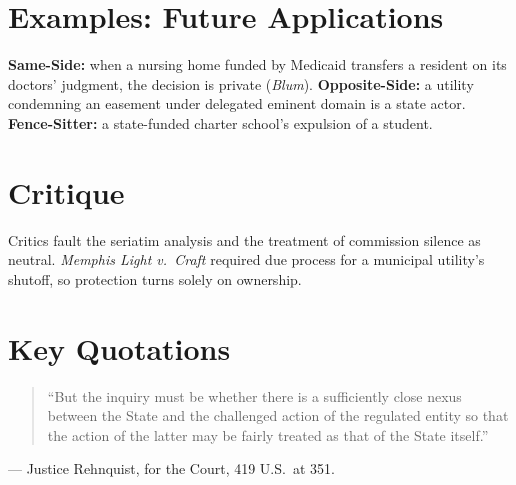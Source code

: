 \documentclass[12pt]{article}
\begin{document}
\section{Examples: Future Applications}
\textbf{Same-Side:} when a nursing home funded by Medicaid transfers a resident on its doctors' judgment, the decision is private (\textit{Blum}). \textbf{Opposite-Side:} a utility condemning an easement under delegated eminent domain is a state actor. \textbf{Fence-Sitter:} a state-funded charter school's expulsion of a student.

\section{Critique}
Critics fault the seriatim analysis and the treatment of commission silence as neutral. \textit{Memphis Light v.\ Craft} required due process for a municipal utility's shutoff, so protection turns solely on ownership.

\section{Key Quotations}
\begin{quote}
``But the inquiry must be whether there is a sufficiently close nexus between the State and the challenged action of the regulated entity so that the action of the latter may be fairly treated as that of the State itself.''
\end{quote}
\noindent --- Justice Rehnquist, for the Court, 419 U.S.\ at 351.
\end{document}

